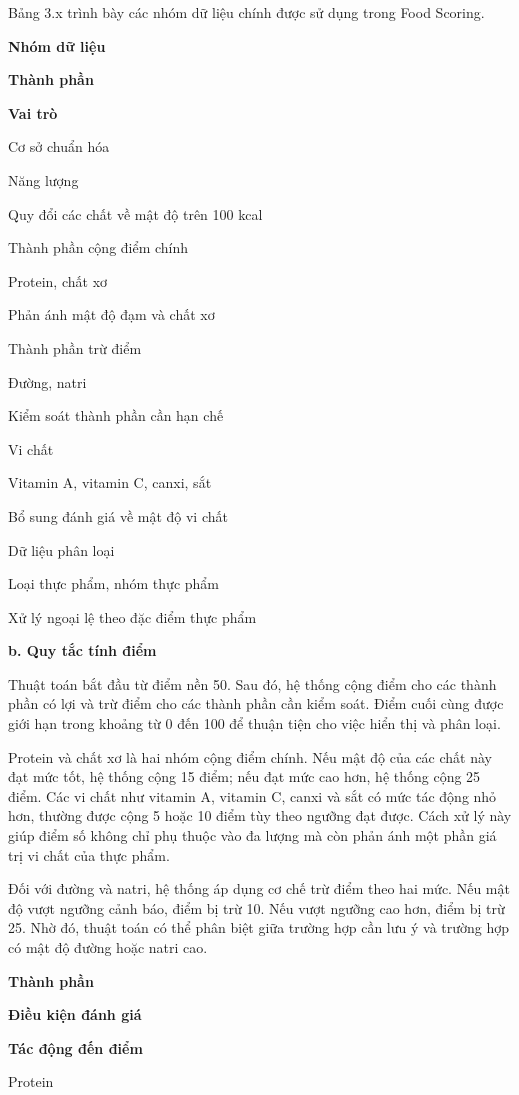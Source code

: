 Bảng 3.x trình bày các nhóm dữ liệu chính được sử dụng trong Food Scoring.

\textbf{Nhóm dữ liệu}

\textbf{Thành phần}

\textbf{Vai trò}

Cơ sở chuẩn hóa

Năng lượng

Quy đổi các chất về mật độ trên 100 kcal

Thành phần cộng điểm chính

Protein, chất xơ

Phản ánh mật độ đạm và chất xơ

Thành phần trừ điểm

Đường, natri

Kiểm soát thành phần cần hạn chế

Vi chất

Vitamin A, vitamin C, canxi, sắt

Bổ sung đánh giá về mật độ vi chất

Dữ liệu phân loại

Loại thực phẩm, nhóm thực phẩm

Xử lý ngoại lệ theo đặc điểm thực phẩm

\textbf{b. Quy tắc tính điểm}

Thuật toán bắt đầu từ điểm nền 50. Sau đó, hệ thống cộng điểm cho các thành phần có lợi và trừ điểm cho các thành phần cần kiểm soát. Điểm cuối cùng được giới hạn trong khoảng từ 0 đến 100 để thuận tiện cho việc hiển thị và phân loại.

Protein và chất xơ là hai nhóm cộng điểm chính. Nếu mật độ của các chất này đạt mức tốt, hệ thống cộng 15 điểm; nếu đạt mức cao hơn, hệ thống cộng 25 điểm. Các vi chất như vitamin A, vitamin C, canxi và sắt có mức tác động nhỏ hơn, thường được cộng 5 hoặc 10 điểm tùy theo ngưỡng đạt được. Cách xử lý này giúp điểm số không chỉ phụ thuộc vào đa lượng mà còn phản ánh một phần giá trị vi chất của thực phẩm.

Đối với đường và natri, hệ thống áp dụng cơ chế trừ điểm theo hai mức. Nếu mật độ vượt ngưỡng cảnh báo, điểm bị trừ 10. Nếu vượt ngưỡng cao hơn, điểm bị trừ 25. Nhờ đó, thuật toán có thể phân biệt giữa trường hợp cần lưu ý và trường hợp có mật độ đường hoặc natri cao.

\textbf{Thành phần}

\textbf{Điều kiện đánh giá}

\textbf{Tác động đến điểm}

Protein

